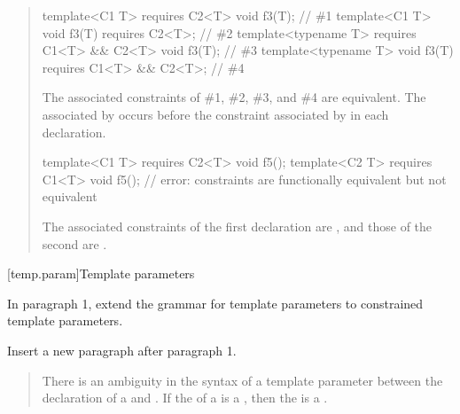 \begin{quote}
\begin{codeblock}
template<C1 T> requires C2<T> void f3(T);                // \#1
template<C1 T> void f3(T) requires C2<T>;                // \#2
template<typename T> requires C1<T> && C2<T> void f3(T); // \#3
template<typename T> void f3(T) requires C1<T> && C2<T>; // \#4
\end{codeblock}
The associated constraints of \#1, \#2, \#3, and \#4 are equivalent. The 
 associated by  occurs before 
the constraint associated by  in each declaration.
% 
\begin{codeblock}
template<C1 T> requires C2<T> void f5();
template<C2 T> requires C1<T> void f5(); // error: constraints are functionally equivalent but not equivalent
\end{codeblock}
% 
The associated constraints of the first declaration are
, and those of the second are
.
\exitexample
\end{quote}


[temp.param]{Template parameters}

In paragraph 1, extend the grammar for template parameters to 
constrained template parameters.

\begin{quote}
\pnum
\begin{bnf}

\end{bnf}
\end{quote}

Insert a new paragraph after paragraph 1.

\begin{quote}
\pnum
There is an ambiguity in the syntax of a template parameter between the
declaration of a  and 
.
% 
If the  of a  
is a , then the 
 is a .
\end{quote}

